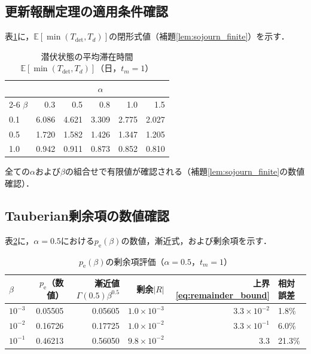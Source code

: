 \documentclass[12pt,a4paper]{article}
\theoremstyle{plain}
\theoremstyle{definition}
\theoremstyle{remark}
\newcommand{\E}{\mathbb{E}}
\newcommand{\pe}{p_{\mathrm{e}}}
\newcommand{\Tdet}{T_{\mathrm{det}}}
\begin{document}
\subsection{更新報酬定理の適用条件確認}

表\ref{tab:sojourn}に，$\E[\min(\Tdet,T_d)]$の閉形式値（補題\ref{lem:sojourn_finite}）を示す．

\begin{table}[h]
\centering
\caption{潜伏状態の平均滞在時間$\E[\min(\Tdet,T_d)]$（日，$t_m=1$）}
\label{tab:sojourn}
\begin{tabular}{@{}lrrrrr@{}}
\toprule
& \multicolumn{5}{c}{$\alpha$} \\
\cmidrule{2-6}
$\beta$ & 0.3 & 0.5 & 0.8 & 1.0 & 1.5 \\
\midrule
0.1 & 6.086 & 4.621 & 3.309 & 2.775 & 2.027 \\
0.5 & 1.720 & 1.582 & 1.426 & 1.347 & 1.205 \\
1.0 & 0.942 & 0.911 & 0.873 & 0.852 & 0.810 \\
\bottomrule
\end{tabular}
\end{table}

全ての$\alpha$および$\beta$の組合せで有限値が確認される（補題\ref{lem:sojourn_finite}の数値確認）．

\subsection{Tauberian剰余項の数値確認}

表\ref{tab:remainder}に，$\alpha=0.5$における$\pe(\beta)$の数値，漸近式，および剰余項を示す．

\begin{table}[h]
\centering
\caption{$\pe(\beta)$の剰余項評価（$\alpha=0.5$，$t_m=1$）}
\label{tab:remainder}
\begin{tabular}{@{}lrrrrl@{}}
\toprule
$\beta$ & $\pe$（数値） & 漸近値$\Gamma(0.5)\beta^{0.5}$ & 剰余$|R|$ & 上界\eqref{eq:remainder_bound} & 相対誤差 \\
\midrule
$10^{-3}$ & 0.05505 & 0.05605 & $1.0\times10^{-3}$ & $3.3\times10^{-2}$ & 1.8\% \\
$10^{-2}$ & 0.16726 & 0.17725 & $1.0\times10^{-2}$ & $3.3\times10^{-1}$ & 6.0\% \\
$10^{-1}$ & 0.46213 & 0.56050 & $9.8\times10^{-2}$ & $3.3$ & 21.3\% \\
\bottomrule
\end{tabular}
\end{table}
\end{document}

